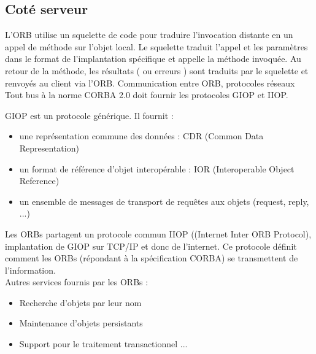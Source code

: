         \subsection*{Coté serveur}
            L'ORB utilise un squelette de code pour traduire l'invocation distante en un appel de méthode sur l'objet local. Le squelette traduit l'appel et les paramètres dans le format de l'implantation spécifique et appelle la méthode invoquée.
            Au retour de la méthode, les résultats ( ou erreurs ) sont traduits par le squelette et renvoyés au client via l'ORB.
            Communication entre ORB, protocoles réseaux
            Tout bus à la norme CORBA 2.0 doit fournir les protocoles GIOP et IIOP.
            
            GIOP est un protocole générique. Il fournit :
            \begin{itemize}[label= $\bullet$]
                \item une représentation commune des données : CDR (Common Data Representation)
                \item un format de référence d'objet interopérable : IOR (Interoperable Object Reference)
                \item un ensemble de messages de transport de requêtes aux objets (request, reply, ...)
            \end{itemize}

            \par Les ORBs partagent un protocole commun IIOP ((Internet Inter ORB Protocol), implantation de GIOP sur TCP/IP et donc de l'internet. Ce protocole définit comment les ORBs (répondant à la spécification CORBA) se transmettent de l'information.\\
            
            Autres services fournis par les ORBs :
            \begin{itemize}[label= $\bullet$]
                \item Recherche d'objets par leur nom
                \item Maintenance d'objets persistants
                \item Support pour le traitement transactionnel ...
            \end{itemize} 